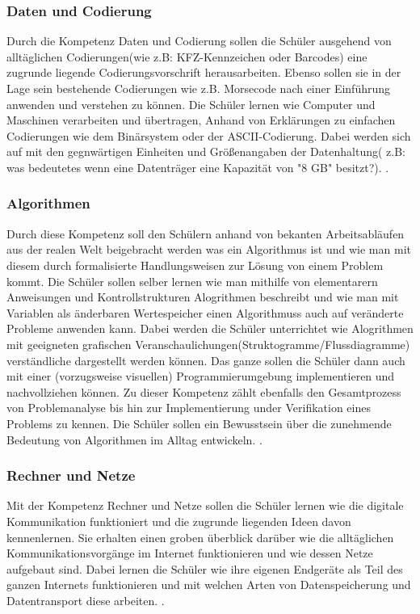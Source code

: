 \subsubsection{Daten und Codierung}

Durch die Kompetenz Daten und Codierung sollen die Schüler ausgehend von alltäglichen Codierungen(wie z.B: KFZ-Kennzeichen oder Barcodes) eine zugrunde liegende Codierungsvorschrift herausarbeiten. Ebenso sollen sie in der Lage sein bestehende Codierungen wie z.B. Morsecode nach einer Einführung anwenden und verstehen zu können. Die Schüler lernen wie Computer und Maschinen verarbeiten und übertragen, Anhand von Erklärungen zu einfachen Codierungen wie dem Binärsystem oder der ASCII-Codierung. Dabei werden sich auf mit den gegnwärtigen Einheiten und Größenangaben der Datenhaltung( z.B: was bedeutetes wenn eine Datenträger eine Kapazität von "8 GB" besitzt?). \cite{Daten}.

\subsubsection{Algorithmen}

Durch diese Kompetenz soll den Schülern anhand von bekanten Arbeitsabläufen aus der realen Welt beigebracht werden was ein Algorithmus ist und wie man mit diesem durch formalisierte Handlungsweisen zur Lösung von einem Problem kommt. Die Schüler sollen selber lernen wie man mithilfe von elementarern Anweisungen und Kontrollstrukturen Alogrithmen beschreibt und wie man mit Variablen als änderbaren Wertespeicher einen Algorithmuss auch auf veränderte Probleme anwenden kann. Dabei werden die Schüler unterrichtet wie Alogrithmen mit geeigneten grafischen Veranschaulichungen(Struktogramme/Flussdiagramme) verständliche dargestellt werden können. Das ganze sollen die Schüler dann auch mit einer (vorzugsweise visuellen) Programmierumgebung implementieren und nachvollziehen können. Zu dieser Kompetenz zählt ebenfalls den Gesamtprozess von Problemanalyse bis hin zur Implementierung under Verifikation eines Problems zu kennen. Die Schüler sollen ein Bewusstsein über die zunehmende Bedeutung von Algorithmen im Alltag entwickeln.
\cite{Algo}.

\subsubsection{Rechner und Netze}

Mit der Kompetenz Rechner und Netze sollen die Schüler lernen wie die digitale Kommunikation funktioniert und die zugrunde liegenden Ideen davon kennenlernen. Sie erhalten einen groben überblick darüber wie die alltäglichen Kommunikationsvorgänge im Internet funktionieren und wie dessen Netze aufgebaut sind. Dabei lernen die Schüler wie ihre eigenen Endgeräte als Teil des ganzen Internets funktionieren und mit welchen Arten von Datenspeicherung und Datentransport diese arbeiten.
\cite{Rechner}.

